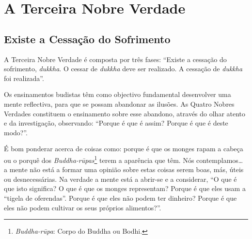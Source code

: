 
\chapter{A Terceira Nobre Verdade}

\pagestyle{topbottomcorner}

\section{Existe a Cessação do Sofrimento}

A Terceira Nobre Verdade é composta por três fases: “Existe a cessação do
sofrimento, \emph{dukkha}. O cessar de \emph{dukkha} deve ser realizado. A
cessação de \emph{dukkha} foi realizada”.

Os ensinamentos budistas têm como objectivo fundamental desenvolver uma mente
reflectiva, para que se possam abandonar as ilusões. As Quatro Nobres Verdades
constituem o ensinamento sobre esse abandono, através do olhar atento e da
investigação, observando: “Porque é que é assim? Porque é que é deste modo?”.

É bom ponderar acerca de coisas como: porque é que os monges rapam a cabeça ou o
porquê dos \emph{Buddha-rūpas}\footnote{%
  \emph{Buddha-rūpa}: Corpo do Buddha ou Bodhi.} terem a aparência que têm. Nós
contemplamos\ldots{} a mente não está a formar uma opinião sobre estas coisas
serem boas, más, úteis ou desnecessárias. Na verdade a mente está a abrir-se e a
considerar, “O que é que isto significa? O que é que os monges representam?
Porque é que eles usam a “tigela de oferendas”. Porque é que eles não podem ter
dinheiro? Porque é que eles não podem cultivar os seus próprios alimentos?”.


